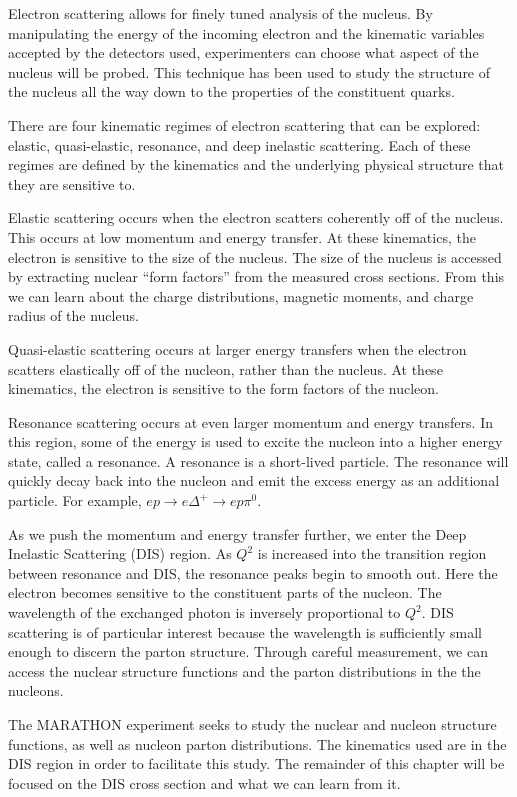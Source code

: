 Electron scattering allows for finely tuned analysis of the nucleus. By manipulating the energy of the incoming electron and the kinematic variables accepted by the detectors used, experimenters can choose what aspect of the nucleus will be probed. This technique has been used to study the structure of the nucleus all the way down to the properties of the constituent quarks.

There are four kinematic regimes of electron scattering that can be explored: elastic, quasi-elastic, resonance, and deep inelastic scattering. Each of these regimes are defined by the kinematics and the underlying physical structure that they are sensitive to.

Elastic scattering occurs when the electron scatters coherently off of the nucleus. This occurs at low momentum and energy transfer. At these kinematics, the electron is sensitive to the size of the nucleus. The size of the nucleus is accessed by extracting nuclear ``form factors'' from the measured cross sections. From this we can learn about the charge distributions, magnetic moments, and charge radius of the nucleus.

Quasi-elastic scattering occurs at larger energy transfers when the electron scatters elastically off of the nucleon, rather than the nucleus. At these kinematics, the electron is sensitive to the form factors of the nucleon.

Resonance scattering occurs at even larger momentum and energy transfers. In this region, some of the energy is used to excite the nucleon into a higher energy state, called a resonance. A resonance is a short-lived particle. The resonance will quickly decay back into the nucleon and emit the excess energy as an additional particle. For example, $ep \rightarrow e\Delta^+ \rightarrow ep\pi^0$.

As we push the momentum and energy transfer further, we enter the Deep Inelastic Scattering (DIS) region. As $Q^2$ is increased into the transition region between resonance and DIS, the resonance peaks begin to smooth out. Here the electron becomes sensitive to the constituent parts of the nucleon. The wavelength of the exchanged photon is inversely proportional to $Q^2$. DIS scattering is of particular interest because the wavelength is sufficiently small enough to discern the parton structure. Through careful measurement, we can access the nuclear structure functions and the parton distributions in the the nucleons.

The MARATHON experiment seeks to study the nuclear and nucleon structure functions, as well as nucleon parton distributions. The kinematics used are in the DIS region in order to facilitate this study. The remainder of this chapter will be focused on the DIS cross section and what we can learn from it.

